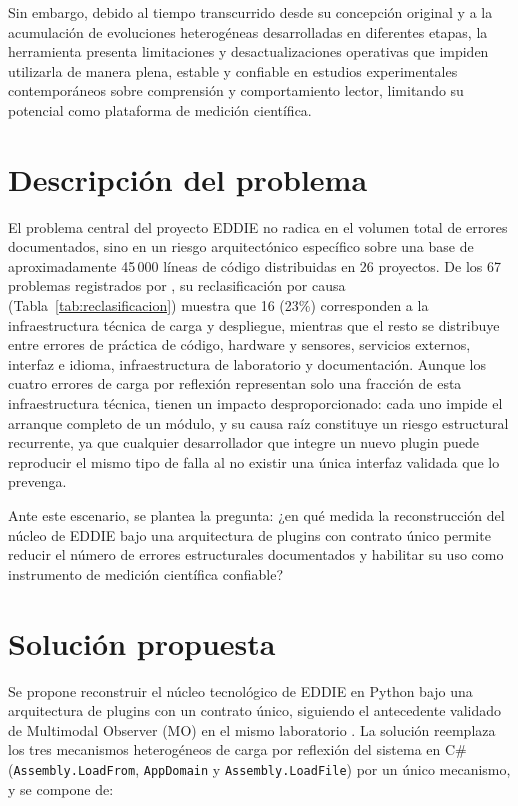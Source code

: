 Sin embargo, debido al tiempo transcurrido desde su concepción original y a la acumulación de evoluciones heterogéneas desarrolladas en diferentes etapas, la herramienta presenta limitaciones y desactualizaciones operativas que impiden utilizarla de manera plena, estable y confiable en estudios experimentales contemporáneos sobre comprensión y comportamiento lector, limitando su potencial como plataforma de medición científica.

\section{Descripción del problema}

El problema central del proyecto EDDIE no radica en el volumen total de errores documentados, sino en un riesgo arquitectónico específico sobre una base de aproximadamente 45\,000 líneas de código distribuidas en 26 proyectos. De los 67 problemas registrados por \citet{ibaceta2023}, su reclasificación por causa (Tabla~\ref{tab:reclasificacion}) muestra que 16 (23\%) corresponden a la infraestructura técnica de carga y despliegue, mientras que el resto se distribuye entre errores de práctica de código, hardware y sensores, servicios externos, interfaz e idioma, infraestructura de laboratorio y documentación. Aunque los cuatro errores de carga por reflexión representan solo una fracción de esta infraestructura técnica, tienen un impacto desproporcionado: cada uno impide el arranque completo de un módulo, y su causa raíz constituye un riesgo estructural recurrente, ya que cualquier desarrollador que integre un nuevo plugin puede reproducir el mismo tipo de falla al no existir una única interfaz validada que lo prevenga.

Ante este escenario, se plantea la pregunta: ¿en qué medida la reconstrucción del núcleo de EDDIE bajo una arquitectura de plugins con contrato único permite reducir el número de errores estructurales documentados y habilitar su uso como instrumento de medición científica confiable?

\section{Solución propuesta}

Se propone reconstruir el núcleo tecnológico de EDDIE en Python bajo una arquitectura de plugins con un contrato único, siguiendo el antecedente validado de Multimodal Observer (MO) en el mismo laboratorio \citep{figueroa2025}. La solución reemplaza los tres mecanismos heterogéneos de carga por reflexión del sistema en C\# (\texttt{Assembly.LoadFrom}, \texttt{AppDomain} y \texttt{Assembly.LoadFile}) por un único mecanismo, y se compone de:

